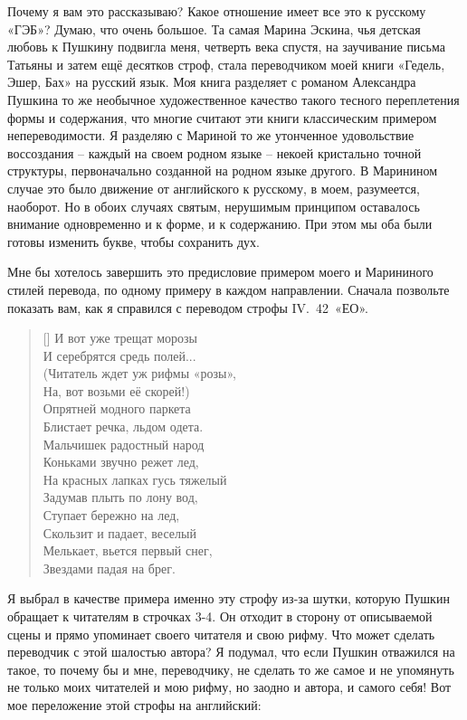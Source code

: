 \documentclass[../main.tex]{subfiles}
\begin{document}
Почему я вам это рассказываю? Какое отношение имеет все это к русскому «ГЭБ»? Думаю, что очень большое. Та самая Марина Эскина, чья детская любовь к Пушкину подвигла меня, четверть века спустя, на заучивание письма Татьяны и затем ещё десятков строф, стала переводчиком моей книги «Гедель, Эшер, Бах» на русский язык. Моя книга разделяет с романом Александра Пушкина то же необычное художественное качество такого тесного переплетения формы и содержания, что многие считают эти книги классическим примером непереводимости. Я разделяю с Мариной то же утонченное удовольствие воссоздания \--- каждый на своем родном языке \--- некоей кристально точной структуры, первоначально созданной на родном языке другого. В Маринином случае это было движение от английского к русскому, в моем, разумеется, наоборот. Но в обоих случаях святым, нерушимым принципом оставалось внимание одновременно и к форме, и к содержанию. При этом мы оба были готовы изменить букве, чтобы сохранить дух.

Мне бы хотелось завершить это предисловие примером моего и Марининого стилей перевода, по одному примеру в каждом направлении. Сначала позвольте показать вам, как я справился с переводом строфы IV.~42~«ЕО».

\settowidth{\versewidth}{Читатель ждет уж рифмы «розы»,}
\begin{verse}[\versewidth]
    И вот уже трещат морозы \\
    И серебрятся средь полей... \\
    (Читатель ждет уж рифмы «розы», \\
    На, вот возьми её скорей!) \\
    Опрятней модного паркета \\
    Блистает речка, льдом одета. \\
    Мальчишек радостный народ \\
    Коньками звучно режет лед, \\
    На красных лапках гусь тяжелый \\
    Задумав плыть по лону вод, \\
    Ступает бережно на лед, \\
    Скользит и падает, веселый \\
    Мелькает, вьется первый снег, \\
    Звездами падая на брег.
\end{verse}

Я выбрал в качестве примера именно эту строфу из-за шутки, которую Пушкин обращает к читателям в строчках 3-4. Он отходит в сторону от описываемой сцены и прямо упоминает своего читателя и свою рифму. Что может сделать переводчик с этой шалостью автора? Я подумал, что если Пушкин отважился на такое, то почему бы и мне, переводчику, не сделать то же самое и не упомянуть не только моих читателей и мою рифму, но заодно и автора, и самого себя! Вот мое переложение этой строфы на английский:
\end{document}
